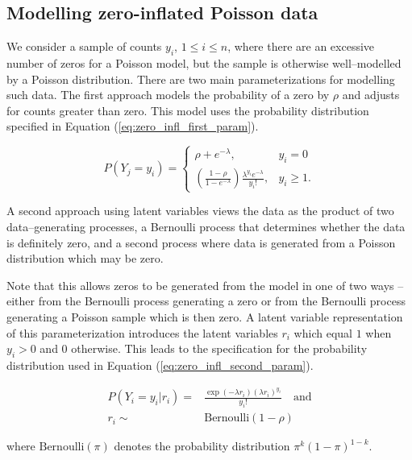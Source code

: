 \subsection{Modelling zero-inflated Poisson data}

We consider a sample of counts $y_i$, $1 \le i\le n$, where there are an excessive number of zeros for a
Poisson model, but the sample is otherwise well--modelled by a Poisson distribution. There are two main
parameterizations for modelling such data. The first approach models the probability of a zero by $\rho$ and
adjusts for counts greater than zero. This model uses the probability distribution specified in
Equation (\ref{eq:zero_infl_first_param}).

\begin{equation}
\label{eq:zero_infl_first_param}
	P(Y_j = y_i) = \left\{ \begin{array}{ll}
	\rho + e^{-\lambda},  & y_i = 0 \\
	\left( \frac{1 - \rho}{1 - e^{-\lambda}} \right) \frac{\lambda^{y_i} e^{-\lambda}} {y_i!},  &y_i \ge 1.
	\end{array} \right.
\end{equation}

A second approach using latent variables views the data as the product of two data--generating processes, a
Bernoulli process that determines whether the data is definitely zero, and a second process where data is
generated from a Poisson distribution which may be zero.

Note that this allows zeros to be generated from the model in one of two ways -- either from the Bernoulli
process generating a zero or from the Bernoulli process generating a Poisson sample which is then zero. A
latent variable representation of this parameterization introduces the latent variables $r_i$ which equal $1$
when $y_i>0$ and $0$ otherwise. This leads to the specification for the probability distribution used in
Equation (\ref{eq:zero_infl_second_param}).

\begin{equation}
\label{eq:zero_infl_second_param}
\begin{array}{rl}
	P(Y_i=y_i|r_i) = & \frac{\exp(-\lambda r_i)(\lambda r_i)^{y_i}}{y_i!} \quad \mbox{and} \\
	r_i \sim & \mbox{Bernoulli}(1-\rho)
\end{array}
\end{equation}

\noindent where $\text{Bernoulli}(\pi)$ denotes the probability distribution $\pi^k (1 - \pi)^{1-k}$.

